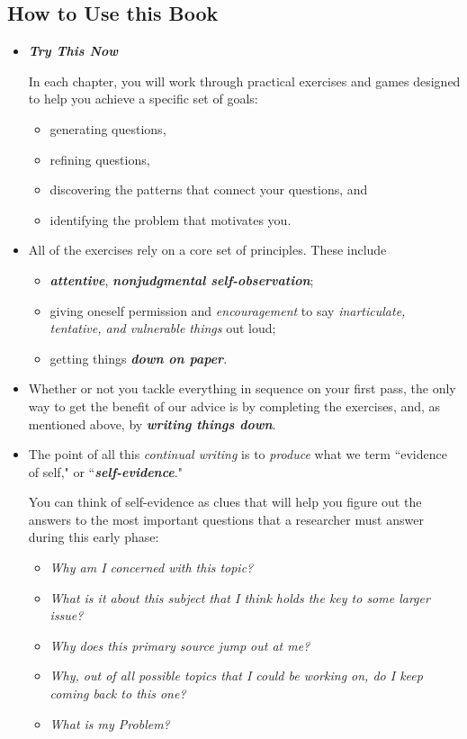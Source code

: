 \documentclass[11pt]{article}
\begin{document}
\subsection{How to Use this Book}
\begin{itemize}
\item \emph{\textbf{Try This Now}}

In each chapter, you will work through practical exercises and games designed to help you achieve a specific set of goals: 
\begin{itemize}
\item generating questions, 
\item refining questions, 
\item discovering the patterns that connect your questions, and 
\item identifying the problem that motivates you. 
\end{itemize}

\item All of the exercises rely on a core set of principles. These include
\begin{itemize}
\item \emph{\textbf{attentive}}, \emph{\textbf{nonjudgmental self-observation}};
\item giving oneself permission and \emph{encouragement} to say \emph{inarticulate, tentative, and vulnerable things} out loud;
\item getting things \emph{\textbf{down on paper}}.
\end{itemize}

\item Whether or not you tackle everything in sequence on your first pass, the only way to get the benefit of our advice is by completing the exercises, and, as mentioned above, by \emph{\textbf{writing things down}}.

\item The point of all this \emph{continual writing} is to \emph{produce} what we term ``evidence of self," or ``\emph{\textbf{self-evidence}}."

You can think of self-evidence as clues that will help you figure out the answers to the most important questions that a researcher must answer during this early phase:
\begin{itemize}
\item \emph{Why am I concerned with this topic? }
\item \emph{What is it about this subject that I think holds the key to some larger issue? }
\item \emph{Why does this primary source jump out at me? }
\item \emph{Why, out of all possible topics that I could be working on, do I keep coming back to this one? }
\item \emph{What is my Problem?}
\end{itemize}


\end{itemize}
\end{document}
